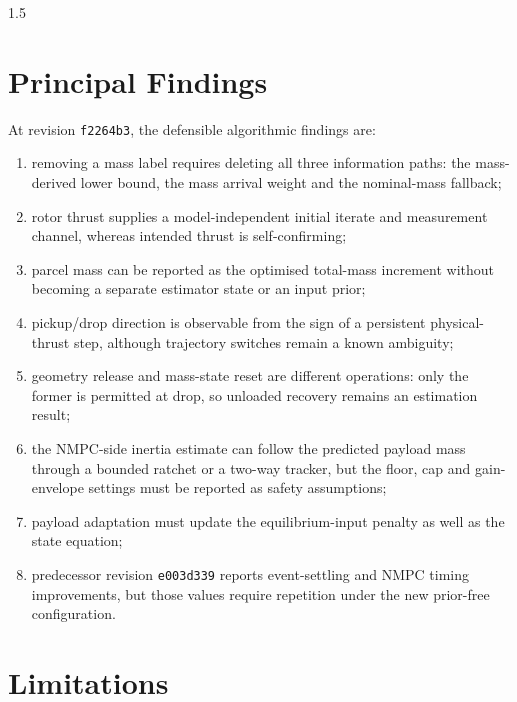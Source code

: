 \begin{spacing}{1.5}
\section{Principal Findings}

At revision \texttt{f2264b3}, the defensible algorithmic findings are:
\begin{enumerate}
    \item removing a mass label requires deleting all three information paths: the mass-derived lower bound, the mass arrival weight and the nominal-mass fallback;
    \item rotor thrust supplies a model-independent initial iterate and measurement channel, whereas intended thrust is self-confirming;
    \item parcel mass can be reported as the optimised total-mass increment without becoming a separate estimator state or an input prior;
    \item pickup/drop direction is observable from the sign of a persistent physical-thrust step, although trajectory switches remain a known ambiguity;
    \item geometry release and mass-state reset are different operations: only the former is permitted at drop, so unloaded recovery remains an estimation result;
    \item the NMPC-side inertia estimate can follow the predicted payload mass through a bounded ratchet or a two-way tracker, but the floor, cap and gain-envelope settings must be reported as safety assumptions;
    \item payload adaptation must update the equilibrium-input penalty as well as the state equation;
    \item predecessor revision \texttt{e003d339} reports event-settling and NMPC timing improvements, but those values require repetition under the new prior-free configuration.
\end{enumerate}


\section{Limitations}


\end{spacing}
